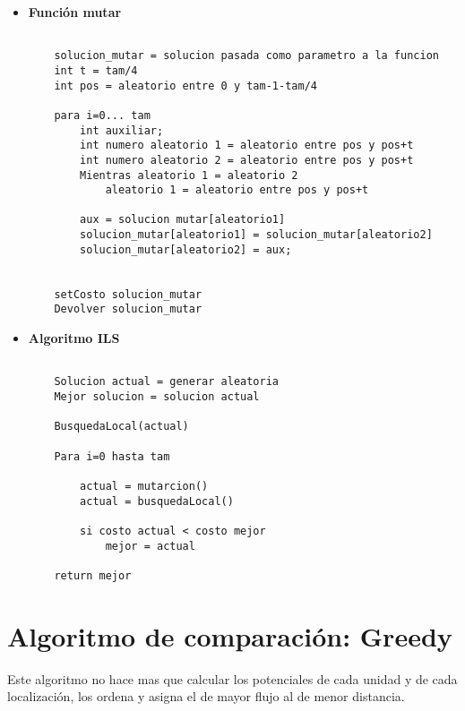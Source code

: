 		\begin{itemize}
		
			\item \textbf{Función mutar}
			
			\begin{lstlisting}[language=SH]
					
	solucion_mutar = solucion pasada como parametro a la funcion
	int t = tam/4
	int pos = aleatorio entre 0 y tam-1-tam/4
	
	para i=0... tam
		int auxiliar;
		int numero aleatorio 1 = aleatorio entre pos y pos+t
		int numero aleatorio 2 = aleatorio entre pos y pos+t
		Mientras aleatorio 1 = aleatorio 2
			aleatorio 1 = aleatorio entre pos y pos+t
		
		aux = solucion mutar[aleatorio1]
		solucion_mutar[aleatorio1] = solucion_mutar[aleatorio2]
		solucion_mutar[aleatorio2] = aux;
		

	setCosto solucion_mutar
	Devolver solucion_mutar

	\end{lstlisting}
		
			\item \textbf{Algoritmo ILS}
			
	\begin{lstlisting}[language=SH]
					
	Solucion actual = generar aleatoria
	Mejor solucion = solucion actual

	BusquedaLocal(actual)

	Para i=0 hasta tam
		
		actual = mutarcion()
		actual = busquedaLocal()
		
		si costo actual < costo mejor
			mejor = actual

	return mejor

	\end{lstlisting}
		
		\end{itemize}
		
\newpage
\section{Algoritmo de comparación: Greedy}
Este algoritmo no hace mas que calcular los potenciales de cada unidad y de cada localización, los ordena y asigna el de mayor flujo al de menor distancia.

